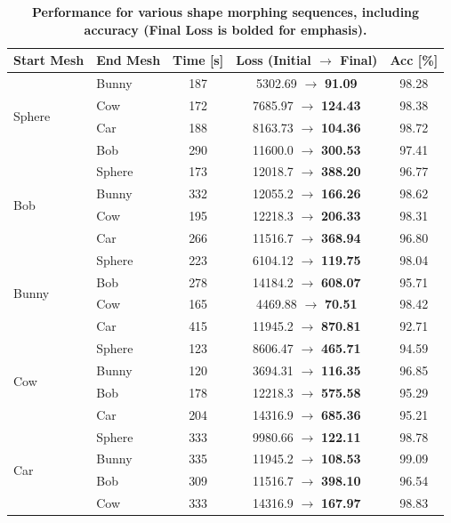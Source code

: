\begin{table}[ht!]
  \scriptsize
  \caption[{Performance for various shape morphing sequences}]{\textbf{Performance for various shape morphing sequences, including accuracy (Final Loss is bolded for emphasis).}}
  \centering
  \begin{tabular}{llccc}
    \toprule
    \textbf{Start Mesh} & \textbf{End Mesh} 
    & \textbf{Time [s]} & \textbf{Loss (Initial $\rightarrow$ \textbf{Final})} & \textbf{Acc [\%]} \\
    \midrule
    \multirow{4}{*}{Sphere}
      & Bunny & 187 & 5302.69 $\rightarrow$ \textbf{91.09} & 98.28 \\
      & Cow  & 172 & 7685.97 $\rightarrow$ \textbf{124.43} & 98.38 \\
      & Car   & 188 & 8163.73 $\rightarrow$ \textbf{104.36} & 98.72 \\
      & Bob   & 290 & 11600.0 $\rightarrow$ \textbf{300.53} & 97.41 \\
    \midrule
    \multirow{4}{*}{Bob}
      & Sphere & 173 & 12018.7 $\rightarrow$ \textbf{388.20} & 96.77 \\
      & Bunny  & 332 & 12055.2 $\rightarrow$ \textbf{166.26} & 98.62 \\
      & Cow   & 195 & 12218.3 $\rightarrow$ \textbf{206.33} & 98.31 \\
      & Car    & 266 & 11516.7 $\rightarrow$ \textbf{368.94} & 96.80 \\
    \midrule
    \multirow{4}{*}{Bunny}
      & Sphere & 223 & 6104.12 $\rightarrow$ \textbf{119.75} & 98.04 \\
      & Bob    & 278 & 14184.2 $\rightarrow$ \textbf{608.07} & 95.71 \\
      & Cow   & 165 & 4469.88 $\rightarrow$ \textbf{70.51} & 98.42 \\
      & Car    & 415 & 11945.2 $\rightarrow$ \textbf{870.81} & 92.71 \\
    \midrule
    \multirow{4}{*}{Cow}
      & Sphere & 123 & 8606.47 $\rightarrow$ \textbf{465.71} & 94.59 \\
      & Bunny  & 120 & 3694.31 $\rightarrow$ \textbf{116.35} & 96.85 \\
      & Bob    & 178 & 12218.3 $\rightarrow$ \textbf{575.58} & 95.29 \\
      & Car    & 204 & 14316.9 $\rightarrow$ \textbf{685.36} & 95.21 \\
    \midrule
    \multirow{4}{*}{Car}
      & Sphere & 333 & 9980.66 $\rightarrow$ \textbf{122.11} & 98.78 \\
      & Bunny  & 335 & 11945.2 $\rightarrow$ \textbf{108.53} & 99.09 \\
      & Bob    & 309 & 11516.7 $\rightarrow$ \textbf{398.10} & 96.54 \\
      & Cow   & 333 & 14316.9 $\rightarrow$ \textbf{167.97} & 98.83 \\
    \bottomrule
  \end{tabular}
  \label{tab:performance}
\end{table}





